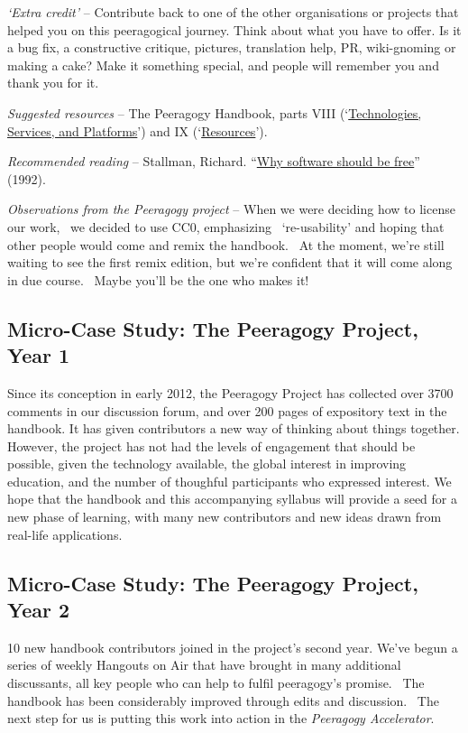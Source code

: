 \emph{`Extra credit'} -- Contribute back to one of the other
organisations or projects that helped you on this peeragogical journey.
Think about what you have to offer. Is it a bug fix, a constructive
critique, pictures, translation help, PR, wiki-gnoming or making a cake?
Make it something special, and people will remember you and thank you
for it.

\emph{Suggested resources} -- The Peeragogy Handbook, parts VIII
(`\href{http://peeragogy.org/resources/technologies/}{Technologies,
Services, and Platforms}') and IX
(`\href{http://peeragogy.org/resources/}{Resources}').

\emph{Recommended reading} -- Stallman, Richard.
``\href{http://www.gnu.org/philosophy/shouldbefree.html}{Why software
should be free}'' (1992).

\emph{Observations from the Peeragogy project} -- When we were deciding
how to license our work,~ we decided to use CC0, emphasizing~
`re-usability' and hoping that other people would come and remix the
handbook.~ At the moment, we're still waiting to see the first remix
edition, but we're confident that it will come along in due course.~
Maybe you'll be the one who makes it!

\subsection{{\tiny Micro-}Case Study: The Peeragogy Project, Year 1}

Since its conception in early 2012, the Peeragogy Project has collected
over 3700 comments in our discussion forum, and over 200 pages of
expository text in the handbook. It has given contributors a new way of
thinking about things together. However, the project has not had the
levels of engagement that should be possible, given the technology
available, the global interest in improving education, and the number of
thoughful participants who expressed interest. We hope that the handbook
and this accompanying syllabus will provide a seed for a new phase of
learning, with many new contributors and new ideas drawn from real-life
applications.

\subsection{{\tiny Micro-}Case Study: The Peeragogy Project, Year 2}

10 new handbook contributors joined in the project's second year. We've
begun a series of weekly Hangouts on Air that have brought in many
additional discussants, all key people who can help to fulfil
peeragogy's promise.~ The handbook has been considerably improved
through edits and discussion.~ The next step for us is putting this work
into action in the \emph{Peeragogy Accelerator}.

